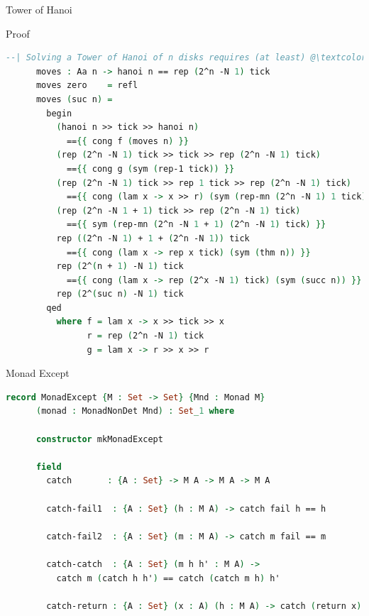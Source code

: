 \documentclass{beamer}
\begin{document}
\begin{frame}[fragile]{Tower of Hanoi}
  \begin{block}{Proof}
    \begin{lstlisting}[language=Agda, mathescape]
      --| Solving a Tower of Hanoi of n disks requires (at least) @\textcolor{DarkRed}{2$^n$-1}@ moves
      moves : Aa n -> hanoi n == rep (2^n -N 1) tick
      moves zero    = refl
      moves (suc n) =
        begin
          (hanoi n >> tick >> hanoi n)
            =={{ cong f (moves n) }}
          (rep (2^n -N 1) tick >> tick >> rep (2^n -N 1) tick)
            =={{ cong g (sym (rep-1 tick)) }}
          (rep (2^n -N 1) tick >> rep 1 tick >> rep (2^n -N 1) tick)
            =={{ cong (lam x -> x >> r) (sym (rep-mn (2^n -N 1) 1 tick)) }}
          (rep (2^n -N 1 + 1) tick >> rep (2^n -N 1) tick)
            =={{ sym (rep-mn (2^n -N 1 + 1) (2^n -N 1) tick) }}
          rep ((2^n -N 1) + 1 + (2^n -N 1)) tick
            =={{ cong (lam x -> rep x tick) (sym (thm n)) }}
          rep (2^(n + 1) -N 1) tick
            =={{ cong (lam x -> rep (2^x -N 1) tick) (sym (succ n)) }}
          rep (2^(suc n) -N 1) tick
        qed
          where f = lam x -> x >> tick >> x
                r = rep (2^n -N 1) tick
                g = lam x -> r >> x >> r
    \end{lstlisting}
  \end{block}
\end{frame}

\begin{frame}[fragile]{Monad Except}
  \begin{lstlisting}[language=Agda, mathescape]
    record MonadExcept {M : Set -> Set} {Mnd : Monad M}
      (monad : MonadNonDet Mnd) : Set_1 where

      constructor mkMonadExcept

      field
        catch       : {A : Set} -> M A -> M A -> M A

        catch-fail1  : {A : Set} (h : M A) -> catch fail h == h

        catch-fail2  : {A : Set} (m : M A) -> catch m fail == m

        catch-catch  : {A : Set} (m h h' : M A) ->
          catch m (catch h h') == catch (catch m h) h'

        catch-return : {A : Set} (x : A) (h : M A) -> catch (return x) h == return x
  \end{lstlisting}
\end{frame}
\end{document}
